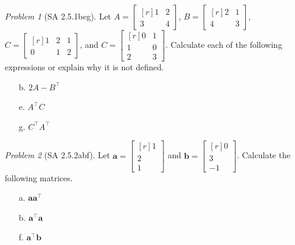 \documentclass[fleqn,11pt]{paper}
\theoremstyle{remark}
\newtheorem{problem}{Problem}
\renewcommand{\vec}[1]{\mathbf{#1}}
\newcommand{\<}{\ensuremath{\langle}}
\renewcommand{\>}{\ensuremath{\rangle}}
\newcommand\va{\vec{a}}
\newcommand\vb{\vec{b}}
\begin{document}
\probskip


\begin{problem}[SA 2.5.1beg]
Let $A =\begin{bmatrix*}[r]1&2\\3&4\end{bmatrix*}$,
$B =\begin{bmatrix*}[r]2&1\\4&3\end{bmatrix*}$,
$C =\begin{bmatrix*}[r]1&2&1\\0&1&2\end{bmatrix*}$, and
$C =\begin{bmatrix*}[r]0&1\\1&0\\2&3\end{bmatrix*}$.
Calculate each of the following expressions or explain why it is not defined.
\begin{multicols}{3}
\begin{enumerate}
\item[b.] $2A - B^\top$
\item[e.] $A^\top C$
\item[g.] $C^\top A^\top$
\end{enumerate}
\end{multicols}
\end{problem}


\probskip

\begin{problem}[SA 2.5.2abf]
Let $\va =\begin{bmatrix*}[r]1\\2\\1\end{bmatrix*}$
and $\vb =\begin{bmatrix*}[r]0\\3\\-1\end{bmatrix*}$.
Calculate the following matrices.
\begin{multicols}{3}
\begin{enumerate}
\item[a.] $\va\va^\top$
\item[b.] $\va^\top \va$
\item[f.] $\va^\top \vb$
\end{enumerate}
\end{multicols}
\end{problem}
\end{document}
